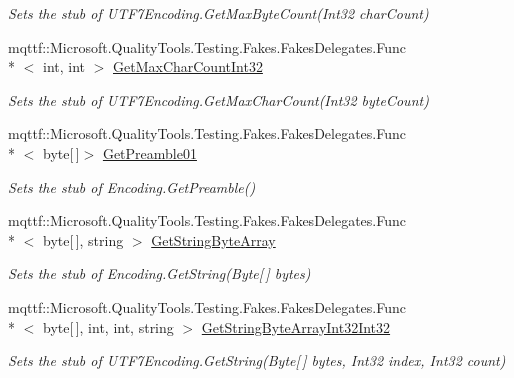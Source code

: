 \begin{DoxyCompactItemize}
\begin{DoxyCompactList}\small\item\em Sets the stub of U\-T\-F7\-Encoding.\-Get\-Max\-Byte\-Count(\-Int32 char\-Count)\end{DoxyCompactList}\item 
mqttf\-::\-Microsoft.\-Quality\-Tools.\-Testing.\-Fakes.\-Fakes\-Delegates.\-Func\\*
$<$ int, int $>$ \hyperlink{class_system_1_1_text_1_1_fakes_1_1_stub_u_t_f7_encoding_adec0a3c2e8f895b4e391065953e7cee2}{Get\-Max\-Char\-Count\-Int32}
\begin{DoxyCompactList}\small\item\em Sets the stub of U\-T\-F7\-Encoding.\-Get\-Max\-Char\-Count(\-Int32 byte\-Count)\end{DoxyCompactList}\item 
mqttf\-::\-Microsoft.\-Quality\-Tools.\-Testing.\-Fakes.\-Fakes\-Delegates.\-Func\\*
$<$ byte\mbox{[}$\,$\mbox{]}$>$ \hyperlink{class_system_1_1_text_1_1_fakes_1_1_stub_u_t_f7_encoding_a119821dd5c20c06ef967846e0350470c}{Get\-Preamble01}
\begin{DoxyCompactList}\small\item\em Sets the stub of Encoding.\-Get\-Preamble()\end{DoxyCompactList}\item 
mqttf\-::\-Microsoft.\-Quality\-Tools.\-Testing.\-Fakes.\-Fakes\-Delegates.\-Func\\*
$<$ byte\mbox{[}$\,$\mbox{]}, string $>$ \hyperlink{class_system_1_1_text_1_1_fakes_1_1_stub_u_t_f7_encoding_a128fc11b8db8888e59262a2e012de5a0}{Get\-String\-Byte\-Array}
\begin{DoxyCompactList}\small\item\em Sets the stub of Encoding.\-Get\-String(\-Byte\mbox{[}$\,$\mbox{]} bytes)\end{DoxyCompactList}\item 
mqttf\-::\-Microsoft.\-Quality\-Tools.\-Testing.\-Fakes.\-Fakes\-Delegates.\-Func\\*
$<$ byte\mbox{[}$\,$\mbox{]}, int, int, string $>$ \hyperlink{class_system_1_1_text_1_1_fakes_1_1_stub_u_t_f7_encoding_a72382e363e6a0c80323714eba85a4447}{Get\-String\-Byte\-Array\-Int32\-Int32}
\begin{DoxyCompactList}\small\item\em Sets the stub of U\-T\-F7\-Encoding.\-Get\-String(\-Byte\mbox{[}$\,$\mbox{]} bytes, Int32 index, Int32 count)\end{DoxyCompactList}\item 

\end{DoxyCompactItemize}

